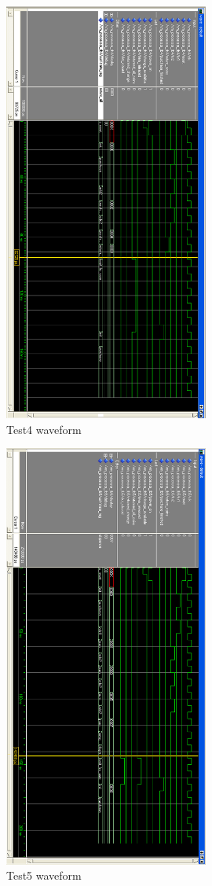 \begin{figure}
\centering
\includegraphics[width=0.6\textwidth]{img/wavetest4.png}
\caption{Test4 waveform}
\label{fig:test4}
\end{figure}

\begin{figure}
\centering
\includegraphics[width=0.6\textwidth]{img/wavetest5.png}
\caption{Test5 waveform}
\label{fig:test5}
\end{figure}